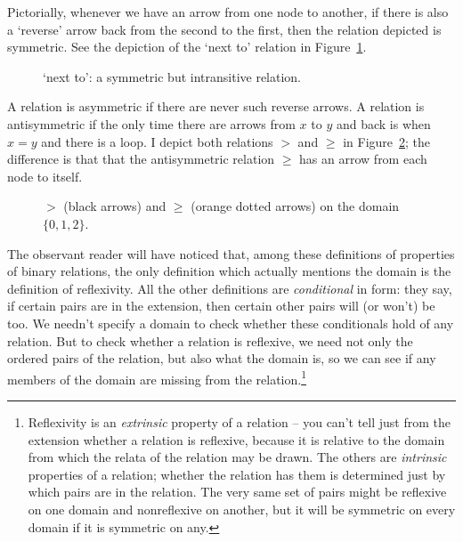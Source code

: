 Pictorially, whenever we have an arrow from one node to another, if there is also a `reverse' arrow back from the second to the first, then the relation depicted is symmetric. See the depiction of the `next to' relation in Figure~\ref{fig:nextto}. 
\begin{figure}[b]
	\caption{`next to': a symmetric but intransitive relation.\label{fig:nextto}}
\end{figure} A relation is asymmetric if there are never such reverse arrows. A relation is antisymmetric if the only time there are arrows from $x$ to $y$ and back is when $x=y$ and there is a loop. I depict both relations $>$ and $≥$ in Figure~\ref{fig:gg}; the difference is that that the antisymmetric relation $≥$ has an arrow from each node to itself.
\begin{figure}[t]
	\caption{$>$ (black arrows) and $≥$ (orange dotted arrows) on the domain $\{0,1,2\}$.\label{fig:gg}}
\end{figure}

The observant reader will have noticed that, among these definitions of properties of binary relations, the only definition which actually mentions the domain is the definition of reflexivity. All the other definitions are \emph{conditional} in form: they say, if certain pairs are in the extension, then certain other pairs will (or won't) be too. We needn’t specify a domain to check whether these conditionals hold of any relation. But to check whether a relation is reflexive, we need not only the ordered pairs of the relation, but also what the domain is, so we can see if any members of the domain are missing from the relation.\footnote{Reflexivity is an \emph{extrinsic} property of a relation – you can't tell just from the extension whether a relation is reflexive, because it is relative to the domain from which the relata of the relation may be drawn. The others are \emph{intrinsic} properties of a relation; whether the relation has them is determined just by which pairs are in the relation. The very same set of pairs might be reflexive on one domain and nonreflexive on another, but it will be symmetric on every domain if it is symmetric on any.}

